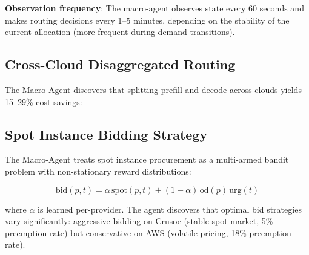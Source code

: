 \documentclass[conference,10pt]{IEEEtran}
\begin{document}
\textbf{Observation frequency}: The macro-agent observes state every 60 seconds and makes routing decisions every 1--5 minutes, depending on the stability of the current allocation (more frequent during demand transitions).

\subsection{Cross-Cloud Disaggregated Routing}

The Macro-Agent discovers that splitting prefill and decode across clouds yields 15--29\% cost savings:

\begin{table}[!htbp]
\caption{RL-Discovered Cross-Cloud Routing Strategies}
\label{tab:routes}
\centering\scriptsize
{}
\end{table}


\subsection{Spot Instance Bidding Strategy}

The Macro-Agent treats spot instance procurement as a multi-armed bandit problem with non-stationary reward distributions:

\begin{equation}
\text{bid}(p,t) = \alpha\,\text{spot}(p,t) + (1{-}\alpha)\,\text{od}(p)\,\text{urg}(t)
\end{equation}

where $\alpha$ is learned per-provider. The agent discovers that optimal bid strategies vary significantly: aggressive bidding on Crusoe (stable spot market, 5\% preemption rate) but conservative on AWS (volatile pricing, 18\% preemption rate).
\end{document}
